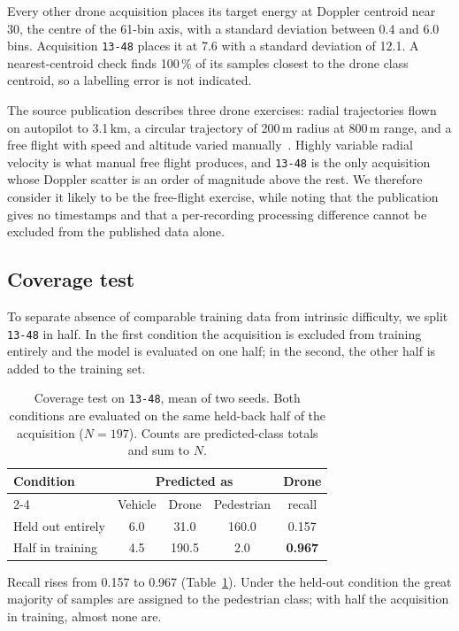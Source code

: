 \documentclass[conference]{IEEEtran}
\begin{document}
Every other drone acquisition places its target energy at Doppler centroid
near 30, the centre of the 61-bin axis, with a standard deviation between
0.4 and 6.0 bins. Acquisition \texttt{13-48} places it at 7.6 with a
standard deviation of 12.1. A nearest-centroid check finds 100\,\% of its
samples closest to the drone class centroid, so a labelling error is not
indicated.

The source publication describes three drone exercises: radial trajectories
flown on autopilot to 3.1\,km, a circular trajectory of 200\,m radius at
800\,m range, and a free flight with speed and altitude varied
manually~\cite{roldan2020}. Highly variable radial velocity is what manual
free flight produces, and \texttt{13-48} is the only acquisition whose
Doppler scatter is an order of magnitude above the rest. We therefore
consider it likely to be the free-flight exercise, while noting that the
publication gives no timestamps and that a per-recording processing
difference cannot be excluded from the published data alone.

\subsection{Coverage test}

To separate absence of comparable training data from intrinsic difficulty,
we split \texttt{13-48} in half. In the first condition the acquisition is
excluded from training entirely and the model is evaluated on one half; in
the second, the other half is added to the training set.

\begin{table}[t]
\caption{Coverage test on \texttt{13-48}, mean of two seeds. Both conditions
are evaluated on the same held-back half of the acquisition ($N=197$). Counts
are predicted-class totals and sum to $N$.}
\label{tab:coverage}
\centering
\small
\setlength{\tabcolsep}{4pt}
\begin{tabular}{lcccc}
\toprule
Condition & \multicolumn{3}{c}{Predicted as} & Drone \\
\cmidrule(lr){2-4}
 & Vehicle & Drone & Pedestrian & recall \\
\midrule
Held out entirely & 6.0 & 31.0 & 160.0 & 0.157 \\
Half in training  & 4.5 & 190.5 & 2.0 & \textbf{0.967} \\
\bottomrule
\end{tabular}
\end{table}

Recall rises from 0.157 to 0.967 (Table~\ref{tab:coverage}). Under the
held-out condition the great majority of samples are assigned to the
pedestrian class; with half the acquisition in training, almost none are.
\end{document}
